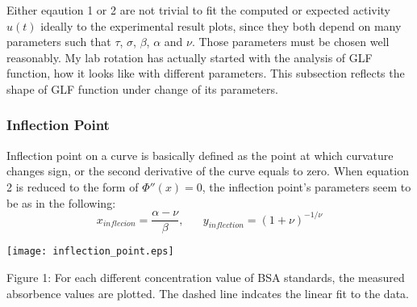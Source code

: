 \documentclass[twocolumn]{article}
\begin{document}
Either eqaution 1 or 2 are not trivial to fit the computed or expected activity $u(t)$ ideally to the experimental result plots, since they both depend on many parameters such that $\tau$, $\sigma$, $\beta$, $\alpha$ and $\nu$. Those parameters must be chosen well reasonably. My lab rotation has actually started with the analysis of GLF function, how it looks like with different parameters. This subsection reflects the shape of GLF function under change of its parameters.

 
\subsubsection{Inflection Point}
Inflection point on a curve is basically defined as the point at which curvature changes sign, or the second derivative of the curve equals to zero. When equation 2 is reduced to the form of $\Phi''(x)=0$, the inflection point's parameters seem to be as in the following:
\begin{equation*}
 x_{inflecion}=\dfrac{\alpha-\nu}{\beta},   \;\;\;\;\;\;        y_{inflection}=(1+\nu)^{-1/\nu}
\end{equation*}

\begin{center}
 \texttt{[image: inflection\_point.eps]}
\begin{footnotesize}Figure 1: For each different concentration value of BSA standards, the measured absorbence values are plotted. The dashed line indcates the linear fit to the data. \end{footnotesize}
\end{center}
\end{document}
